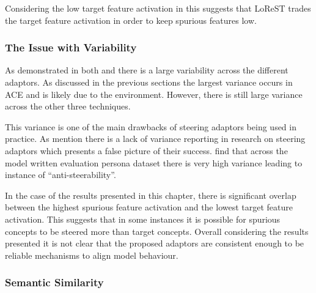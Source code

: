 Considering the low target feature activation in  this suggests that LoReST trades the target feature activation in order to keep spurious features low.

\subsubsection{The Issue with Variability}
\label{sec:variability}

As demonstrated in both  and  there is a large variability across the different adaptors.
As discussed in the previous sections the largest variance occurs in ACE and is likely due to the environment.
However, there is still large variance across the other three techniques.

This variance is one of the main drawbacks of steering adaptors being used in practice.
As \citet{steerability} mention there is a lack of variance reporting in research on steering adaptors which presents a false picture of their success.
\citet{steerability} find that across the model written evaluation persona dataset \citep{mwe} there is very high variance leading to instance of ``anti-steerability''.

In the case of the results presented in this chapter, there is significant overlap between the highest spurious feature activation and the lowest target feature activation.
This suggests that in some instances it is possible for spurious concepts to be steered more than target concepts.
Overall considering the results presented it is not clear that the proposed adaptors are consistent enough to be reliable mechanisms to align model behaviour.

\subsubsection{Semantic Similarity}

